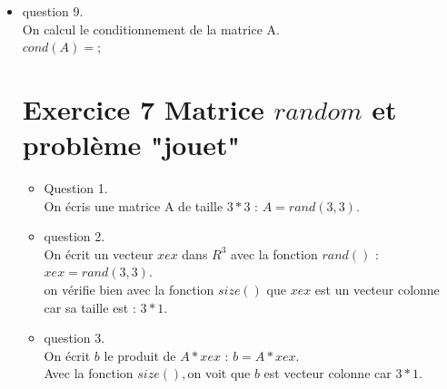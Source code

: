 \documentclass[]{article}
\begin{document}
\begin{itemize}
\item {question 9. \\}
On calcul le conditionnement de la matrice A.\\
$cond(A) = $;\\

\section{Exercice 7  Matrice $ random$ et problème "jouet"}

\begin{itemize}
\item {Question 1. \\}
On écris une matrice A de taille $3*3$ : $ A = rand(3,3)$.\\

\item {question 2. \\}
On écrit un vecteur $xex$ dans $R^{3}$ avec la fonction $rand()$ : $ xex = rand(3,3)$.\\
on vérifie bien avec la fonction $size()$ que  $ xex $ est un vecteur colonne car sa taille est : $ 3*1$.\\

\item {question 3. \\}
On écrit $b$ le produit de $ A*xex $ : $ b = A*xex$.\\
Avec la fonction $ size(), $on voit que $b$ est vecteur colonne car $3*1$.\\ 
\end{itemize}
\end{itemize}
\end{document}
